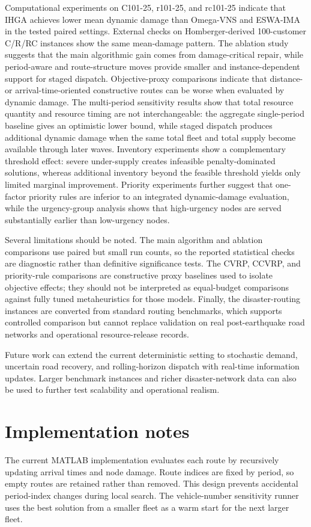 ﻿\documentclass[preprint,12pt,authoryear]{elsarticle}
\begin{document}
Computational experiments on C101-25, r101-25, and rc101-25 indicate that IHGA achieves lower mean dynamic damage than Omega-VNS and ESWA-IMA in the tested paired settings. External checks on Homberger-derived 100-customer C/R/RC instances show the same mean-damage pattern. The ablation study suggests that the main algorithmic gain comes from damage-critical repair, while period-aware and route-structure moves provide smaller and instance-dependent support for staged dispatch. Objective-proxy comparisons indicate that distance- or arrival-time-oriented constructive routes can be worse when evaluated by dynamic damage. The multi-period sensitivity results show that total resource quantity and resource timing are not interchangeable: the aggregate single-period baseline gives an optimistic lower bound, while staged dispatch produces additional dynamic damage when the same total fleet and total supply become available through later waves. Inventory experiments show a complementary threshold effect: severe under-supply creates infeasible penalty-dominated solutions, whereas additional inventory beyond the feasible threshold yields only limited marginal improvement. Priority experiments further suggest that one-factor priority rules are inferior to an integrated dynamic-damage evaluation, while the urgency-group analysis shows that high-urgency nodes are served substantially earlier than low-urgency nodes.

Several limitations should be noted. The main algorithm and ablation comparisons use paired but small run counts, so the reported statistical checks are diagnostic rather than definitive significance tests. The CVRP, CCVRP, and priority-rule comparisons are constructive proxy baselines used to isolate objective effects; they should not be interpreted as equal-budget comparisons against fully tuned metaheuristics for those models. Finally, the disaster-routing instances are converted from standard routing benchmarks, which supports controlled comparison but cannot replace validation on real post-earthquake road networks and operational resource-release records.

Future work can extend the current deterministic setting to stochastic demand, uncertain road recovery, and rolling-horizon dispatch with real-time information updates. Larger benchmark instances and richer disaster-network data can also be used to further test scalability and operational realism.

\appendix
\section{Implementation notes}
\label{app:implementation}

The current MATLAB implementation evaluates each route by recursively updating arrival times and node damage. Route indices are fixed by period, so empty routes are retained rather than removed. This design prevents accidental period-index changes during local search. The vehicle-number sensitivity runner uses the best solution from a smaller fleet as a warm start for the next larger fleet.



\end{document}
